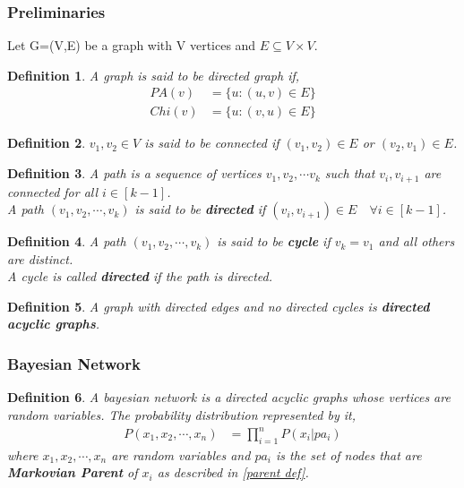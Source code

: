 \documentclass{article}
\newtheorem{definition}{Definition}[section]
\begin{document}
    \subsubsection{Preliminaries}
    Let G=(V,E) be a graph with V vertices and $E \subseteq V \times V$.
    \begin{definition}
         A graph is said to be directed graph if, 
         \begin{align*}
             PA(v)&=\{ u: (u,v) \in E\}\\
             Chi(v)&= \{u:(v,u) \in E\}
         \end{align*}
    \end{definition}
    \begin{definition}
        $v_1,v_2 \in V$ is said to be connected if $(v_1,v_2) \in E$ or $(v_2,v_1)\in E$.
    \end{definition}
    \begin{definition}
        A path is a sequence of vertices $v_1,v_2,\cdots v_k$ such that $v_i,v_{i+1}$ are connected for all $i \in [k-1]$. \\
        \noindent
        A path $(v_1,v_2,\cdots,v_k)$ is said to be \textbf{directed} if $(v_i,v_{i+1}) \in E \quad \forall i \in [k-1] $.
    \end{definition}
    \begin{definition}
        A path $(v_1,v_2,\cdots,v_k)$ is said to be \textbf{cycle} if $v_k=v_1$ and all others are distinct. 
        \\
        A cycle is called \textbf{directed} if the path is directed.
    \end{definition}
    \begin{definition}
        A graph with directed edges and no directed cycles is \textbf{directed acyclic graphs}.
    \end{definition}
    \subsubsection{Bayesian Network}
    \begin{definition}
        A bayesian network is a directed acyclic graphs whose vertices are random variables. 
    The probability distribution represented by it,
    \begin{align}
        \label{bayesian network}
        P(x_1,x_2,\cdots,x_n)&= \prod_{i=1}^{n}P(x_i|pa_i)
    \end{align}
    where $x_1,x_2,\cdots,x_n$ are random variables 
    and $pa_i$ is the set of nodes that are \textbf{Markovian Parent} of $x_i$ as described in \cref{parent def}.     
    \end{definition}
\end{document}
